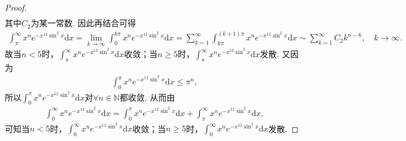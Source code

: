 \documentclass[../../main.tex]{subfiles}%
\begin{document}
\begin{proof}
\begin{align*}
\end{align*}
其中$C_2$为某一常数. 因此再结合可得
\begin{align*}
\int_{\pi}^{\infty}{x^ne^{-x^{12}\sin ^2x}\mathrm{d}x}=\underset{k\rightarrow \infty}{\lim}\int_0^{k\pi}{x^ne^{-x^{12}\sin ^2x}\mathrm{d}x}=\sum_{k=1}^{\infty}{\int_{k\pi}^{(k+1)\pi}{x^ne^{-x^{12}\sin ^2x}\mathrm{d}x}}\sim \sum_{k=1}^{\infty}{C_2k^{n-6},\quad k\rightarrow \infty}.
\end{align*}
故当$n<5$时，$\int_{\pi}^{\infty}x^ne^{-x^{12}\sin^2x}\mathrm{d}x$收敛；当$n\geqslant 5$时，$\int_{\pi}^{\infty}x^ne^{-x^{12}\sin^2x}\mathrm{d}x$发散. 又因为
\begin{align*}
\int_0^{\pi}x^ne^{-x^{12}\sin^2x}\mathrm{d}x\leqslant \pi^n,
\end{align*}
所以$\int_0^{\pi}x^ne^{-x^{12}\sin^2x}\mathrm{d}x$对$\forall n\in \mathbb{N}$都收敛. 从而由
\begin{align*}
\int_0^{\infty}x^ne^{-x^{12}\sin^2x}\mathrm{d}x=\int_0^{\pi}x^ne^{-x^{12}\sin^2x}\mathrm{d}x+\int_{\pi}^{\infty}x^ne^{-x^{12}\sin^2x}\mathrm{d}x,
\end{align*}
可知当$n<5$时，$\int_0^{\infty}x^ne^{-x^{12}\sin^2x}\mathrm{d}x$收敛；当$n\geqslant 5$时，$\int_0^{\infty}x^ne^{-x^{12}\sin^2x}\mathrm{d}x$发散.

\end{proof}
\end{document}
